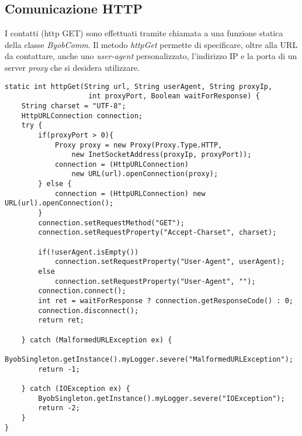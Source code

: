 \subsection{Comunicazione HTTP}
I contatti (http GET) sono effettuati tramite chiamata a una funzione statica della classe \textit{ByobComm}.
Il metodo \textit{httpGet} permette di specificare, oltre alla URL da contattare, anche uno \textit{user-agent} personalizzato, l'indirizzo IP e la porta di un server \textit{proxy} che si desidera utilizzare.

\vspace{0.5cm}
\begin{lstlisting}
static int httpGet(String url, String userAgent, String proxyIp, 
					int proxyPort, Boolean waitForResponse) {  
    String charset = "UTF-8"; 
    HttpURLConnection connection;
    try {
	    if(proxyPort > 0){
		    Proxy proxy = new Proxy(Proxy.Type.HTTP, 
			    new InetSocketAddress(proxyIp, proxyPort));
		    connection = (HttpURLConnection) 
			    new URL(url).openConnection(proxy);
	    } else {
		    connection = (HttpURLConnection) new URL(url).openConnection();
	    }
	    connection.setRequestMethod("GET");
	    connection.setRequestProperty("Accept-Charset", charset);
	    
	    if(!userAgent.isEmpty())
		    connection.setRequestProperty("User-Agent", userAgent);
	    else
		    connection.setRequestProperty("User-Agent", "");
	    connection.connect();
	    int ret = waitForResponse ? connection.getResponseCode() : 0;
	    connection.disconnect();
	    return ret;
	    
    } catch (MalformedURLException ex) {
	    ByobSingleton.getInstance().myLogger.severe("MalformedURLException");
	    return -1;
    
    } catch (IOException ex) {
	    ByobSingleton.getInstance().myLogger.severe("IOException");
	    return -2; 
    }   
}
\end{lstlisting} 




